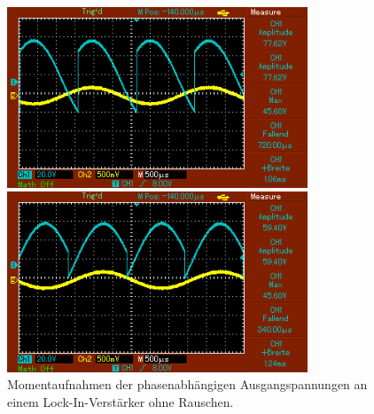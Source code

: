 \begin{figure}
\begin{minipage}{0.5\textwidth}
        \caption{$\phi = \SI{240}{\degree}$.} 
        \label{fig:16}
    \end{minipage}
    \vspace{1cm}
    \vfill
    \begin{minipage}{0.5\textwidth}
        \centering
        \includegraphics[width=0.8\textwidth]{bilder/300ohne.png}
        \caption{$\phi = \SI{300}{\degree}$.} 
        \label{fig:17}
    \end{minipage}
    \hfill
    \begin{minipage}{0.5\textwidth}
        \centering
        \includegraphics[width=0.8\textwidth]{bilder/360ohne.png}
        \caption{$\phi = \SI{360}{\degree}$.} 
        \label{fig:18}
    \end{minipage}
    \caption{Momentaufnahmen der phasenabhängigen Ausgangspannungen an einem Lock-In-Verstärker ohne Rauschen.}
\end{figure}

